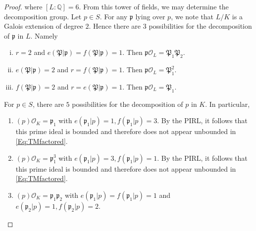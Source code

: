 \begin{proof}
where $[L:\mathbb{Q}] = 6$. From this tower of fields, we may determine the decomposition group. Let $p \in S$. For any $\mathfrak{p}$ lying over $p$, we note that $L/K$ is a Galois extension of degree $2$. Hence there are 3 possibilities for the decomposition of $\mathfrak{p}$ in $L$. Namely
\begin{enumerate}[i.]
\item $r = 2$ and  $e(\mathfrak{P}|\mathfrak{p}) = f(\mathfrak{P}|\mathfrak{p}) = 1$. Then $\mathfrak{p}\mathcal{O}_L = \mathfrak{P}_1\mathfrak{P}_2.$
\item $e(\mathfrak{P}|\mathfrak{p}) = 2$ and $r = f(\mathfrak{P}|\mathfrak{p}) = 1$. Then $\mathfrak{p}\mathcal{O}_L = \mathfrak{P}_1^2.$
\item $f(\mathfrak{P}|\mathfrak{p}) = 2$ and $r = e(\mathfrak{P}|\mathfrak{p}) = 1$. Then $\mathfrak{p}\mathcal{O}_L = \mathfrak{P}_1.$
\end{enumerate}

For $p \in S$, there are $5$ possibilities for the decomposition of $p$ in $K$. In particular,
\begin{enumerate}[1.]
\item $(p)\mathcal{O}_K = \mathfrak{p}_1$ with $e(\mathfrak{p}_1|p) = 1, f(\mathfrak{p}_1|p) = 3$. By the PIRL, it follows that this prime ideal is bounded and therefore does not appear unbounded in \eqref{Eq:TMfactored}.
\item $(p)\mathcal{O}_K = \mathfrak{p}_1^3$ with $e(\mathfrak{p}_1|p) = 3, f(\mathfrak{p}_1|p) = 1$. By the PIRL, it follows that this prime ideal is bounded and therefore does not appear unbounded in \eqref{Eq:TMfactored}.

\item $(p)\mathcal{O}_K = \mathfrak{p}_1 \mathfrak{p}_2$ with $e(\mathfrak{p}_1|p) = f(\mathfrak{p}_1|p) = 1$ and $e(\mathfrak{p}_2|p) = 1, f(\mathfrak{p}_2|p) = 2$.


\end{enumerate}
\end{proof}
